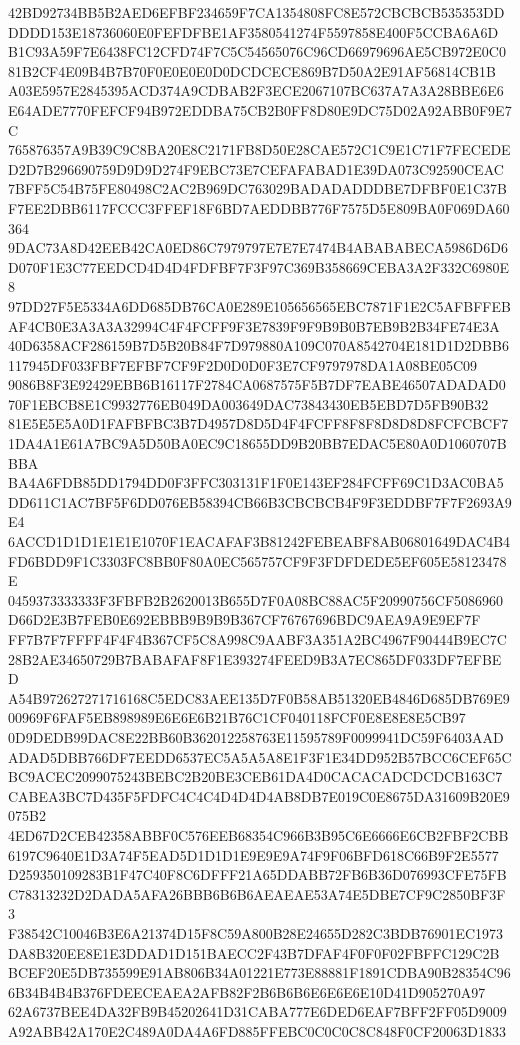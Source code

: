 \documentclass[UTF8,fontset=fandol,zihao=-4,a4paper]{ctexart}
\begin{document}
{{42BD92734BB5B2AED6EFBF234659F7CA1354808FC8E572CBCBCB535353DDDDDD153E18736060E0FEFDFBE1AF3580541274F5597858E400F5CCBA6A6D
B1C93A59F7E6438FC12CFD74F7C5C54565076C96CD66979696AE5CB972E0C081B2CF4E09B4B7B70F0E0E0E0D0DCDCECE869B7D50A2E91AF56814CB1B
A03E5957E2845395ACD374A9CDBAB2F3ECE2067107BC637A7A3A28BBE6E6E64ADE7770FEFCF94B972EDDBA75CB2B0FF8D80E9DC75D02A92ABB0F9E7C
765876357A9B39C9C8BA20E8C2171FB8D50E28CAE572C1C9E1C71F7FECEDED2D7B296690759D9D9D274F9EBC73E7CEFAFABAD1E39DA073C92590CEAC
7BFF5C54B75FE80498C2AC2B969DC763029BADADADDDBE7DFBF0E1C37BF7EE2DBB6117FCCC3FFEF18F6BD7AEDDBB776F7575D5E809BA0F069DA60364
9DAC73A8D42EEB42CA0ED86C7979797E7E7E7474B4ABABABECA5986D6D6D070F1E3C77EEDCD4D4D4FDFBF7F3F97C369B358669CEBA3A2F332C6980E8
97DD27F5E5334A6DD685DB76CA0E289E105656565EBC7871F1E2C5AFBFFEBAF4CB0E3A3A3A32994C4F4FCFF9F3E7839F9F9B9B0B7EB9B2B34FE74E3A
40D6358ACF286159B7D5B20B84F7D979880A109C070A8542704E181D1D2DBB6117945DF033FBF7EFBF7CF9F2D0D0D0F3E7CF9797978DA1A08BE05C09
9086B8F3E92429EBB6B16117F2784CA0687575F5B7DF7EABE46507ADADAD070F1EBCB8E1C9932776EB049DA003649DAC73843430EB5EBD7D5FB90B32
81E5E5E5A0D1FAFBFBC3B7D4957D8D5D4F4FCFF8F8F8D8D8D8FCFCBCF71DA4A1E61A7BC9A5D50BA0EC9C18655DD9B20BB7EDAC5E80A0D1060707BBBA
BA4A6FDB85DD1794DD0F3FFC303131F1F0E143EF284FCFF69C1D3AC0BA5DD611C1AC7BF5F6DD076EB58394CB66B3CBCBCB4F9F3EDDBF7F7F2693A9E4
6ACCD1D1D1E1E1E1070F1EACAFAF3B81242FEBEABF8AB06801649DAC4B4FD6BDD9F1C3303FC8BB0F80A0EC565757CF9F3FDFDEDE5EF605E58123478E
0459373333333F3FBFB2B2620013B655D7F0A08BC88AC5F20990756CF5086960D66D2E3B7FEB0E692EBBB9B9B9B367CF76767696BDC9AEA9A9E9EF7F
FF7B7F7FFFF4F4F4B367CF5C8A998C9AABF3A351A2BC4967F90444B9EC7C28B2AE34650729B7BABAFAF8F1E393274FEED9B3A7EC865DF033DF7EFBED
A54B972627271716168C5EDC83AEE135D7F0B58AB51320EB4846D685DB769E900969F6FAF5EB898989E6E6E6B21B76C1CF040118FCF0E8E8E8E5CB97
0D9DEDB99DAC8E22BB60B362012258763E11595789F0099941DC59F6403AADADAD5DBB766DF7EEDD6537EC5A5A5A8E1F3F1E34DD952B57BCC6CEF65C
BC9ACEC2099075243BEBC2B20BE3CEB61DA4D0CACACADCDCDCB163C7CABEA3BC7D435F5FDFC4C4C4D4D4D4AB8DB7E019C0E8675DA31609B20E9075B2
4ED67D2CEB42358ABBF0C576EEB68354C966B3B95C6E6666E6CB2FBF2CBB6197C9640E1D3A74F5EAD5D1D1D1E9E9E9A74F9F06BFD618C66B9F2E5577
D259350109283B1F47C40F8C6DFFF21A65DDABB72FB6B36D076993CFE75FBC78313232D2DADA5AFA26BBB6B6B6AEAEAE53A74E5DBE7CF9C2850BF3F3
F38542C10046B3E6A21374D15F8C59A800B28E24655D282C3BDB76901EC1973DA8B320EE8E1E3DDAD1D151BAECC2F43B7DFAF4F0F0F02FBFFC129C2B
BCEF20E5DB735599E91AB806B34A01221E773E88881F1891CDBA90B28354C966B34B4B4B376FDEECEAEA2AFB82F2B6B6B6E6E6E6E10D41D905270A97
62A6737BEE4DA32FB9B45202641D31CABA777E6DED6EAF7BFF2FF05D9009A92ABB42A170E2C489A0DA4A6FD885FFEBC0C0C0C8C848F0CF20063D1833
}}
\end{document}
